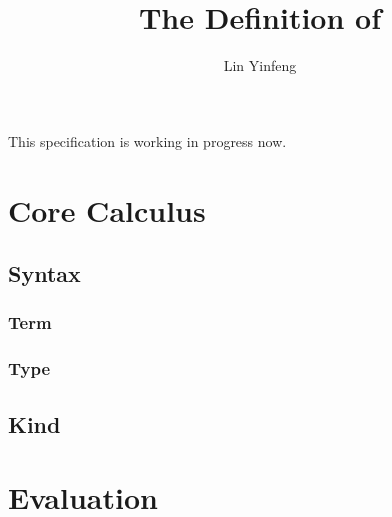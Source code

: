 \documentclass[a4paper]{article}
\title{The Definition of \theLang}
\author{Lin Yinfeng}
\begin{document}
\maketitle

This specification is working in progress now.

\section{Core Calculus}

\subsection{Syntax}

\subsubsection{Term}

\subsubsection{Type}

\subsection{Kind}

\section{Evaluation}
\end{document}
